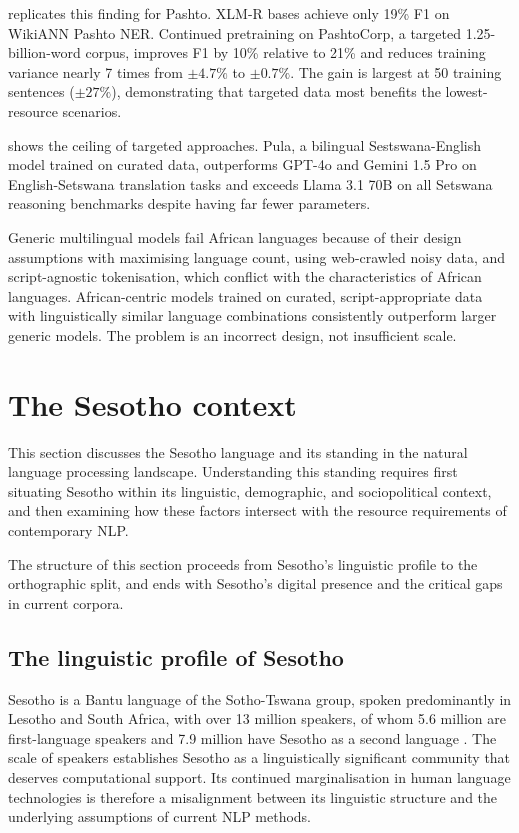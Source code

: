 \documentclass[12pt]{ThesisRU}
\begin{document}
\citet{rahman2026pashtocorp} replicates this finding for Pashto. XLM-R bases achieve only 19\% F1 on WikiANN Pashto NER. Continued pretraining on PashtoCorp, a targeted 1.25-billion-word corpus, improves F1 by 10\% relative to 21\% and reduces training variance nearly 7 times from $\pm 4.7\%$ to $\pm 0.7\%$. The gain is largest at 50 training sentences ($\pm 27\%$), demonstrating that targeted data most benefits the lowest-resource scenarios.

\citet{brown2025pula} shows the ceiling of targeted approaches. Pula, a bilingual Sestswana-English model trained on curated data, outperforms GPT-4o and Gemini 1.5 Pro on English-Setswana translation tasks and exceeds Llama 3.1 70B on all Setswana reasoning benchmarks despite having far fewer parameters.

Generic multilingual models fail African languages because of their design assumptions with maximising language count, using web-crawled noisy data, and script-agnostic tokenisation, which conflict with the characteristics of African languages. African-centric models trained on curated, script-appropriate data with linguistically similar language combinations consistently outperform larger generic models. The problem is an incorrect design, not insufficient scale.

\clearpage
\section{The Sesotho context}
This section discusses the Sesotho language and its standing in the natural language processing landscape. Understanding this standing requires first situating Sesotho within its linguistic, demographic, and sociopolitical context, and then examining how these factors intersect with the resource requirements of contemporary NLP.

The structure of this section proceeds from Sesotho's linguistic profile to the orthographic split, and ends with Sesotho's digital presence and the critical gaps in current corpora.

\subsection{The linguistic profile of Sesotho}
Sesotho is a Bantu language of the Sotho-Tswana group, spoken predominantly in Lesotho and South Africa, with over 13 million speakers, of whom 5.6 million are first-language speakers and 7.9 million have Sesotho as a second language \citep{mokoaleli2020sesotho}. The scale of speakers establishes Sesotho as a linguistically significant community that deserves computational support. Its continued marginalisation in human language technologies is therefore a misalignment between its linguistic structure and the underlying assumptions of current NLP methods.
\end{document}
